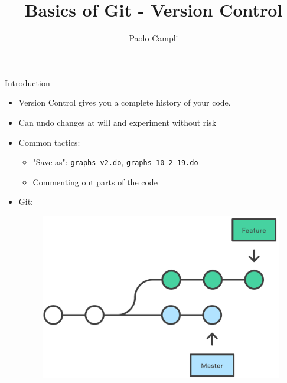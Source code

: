 \documentclass[12pt]{beamer}
\begin{document}
	\author{Paolo Campli}
		\vspace{1cm}
	\title{Basics of Git - Version Control}

	\begin{frame}[plain]
	\maketitle
	\end{frame}


\begin{frame}{Introduction}
\begin{itemize}
	\item Version Control gives you a complete history of your code.
	\vspace{.1cm}
	\item Can undo changes at will and experiment without risk
	
	\vspace{.4cm}
	\item Common tactics:  
	\begin{itemize}
		\item "Save as": \texttt{graphs-v2.do}, \texttt{graphs-10-2-19.do} 
		
		\item Commenting out parts of the code
	\end{itemize}
	\vspace{.1cm}
	\item Git: 
	\begin{figure}
		\includegraphics[scale=0.12]{figures/Git-Forked-History1.png}
	\end{figure}
\end{itemize}

\end{frame}
\end{document}
